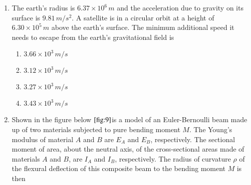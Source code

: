 \documentclass[journal]{IEEEtran}
\numberwithin{equation}{enumi}
\numberwithin{figure}{enumi}
\begin{document}
\begin{enumerate}
\begin{multicols}{2}
    \begin{enumerate}
        \item $ x = 10 \sin 24.76t $
        \item $ x = 10 \cos 24.76t $
        \item $ x = \sin 16t $
        \item $ x = 10 \cos 16t $
    \end{enumerate}
\end{multicols}
\bigskip
\item The earth's radius is $6.37 \times 10^6 \, m$ and the acceleration due to gravity on its surface is $9.81 \, m/s^2$. A satellite is in a circular orbit at a height of $6.30 \times 10^5 \, m$ above the earth's surface. The minimum additional speed it needs to escape from the earth's gravitational field is
\begin{multicols}{2}
    \begin{enumerate}
        \item $ 3.66 \times 10^3 \, m/s $
        \item $ 3.12 \times 10^3 \, m/s $
        \item $ 3.27 \times 10^3 \, m/s $
        \item $ 3.43 \times 10^3 \, m/s $
    \end{enumerate}
\end{multicols}
\bigskip
\item Shown in the figure below $\ref{fig:9}$is a model of an Euler-Bernoulli beam made up of two materials subjected to pure bending moment $M$. The Young's modulus of material $A$ and $B$ are $E_A$ and $E_B$, respectively. The sectional moment of area, about the neutral axis, of the cross-sectional areas made of materials $A$ and $B$, are $I_A$ and $I_B$, respectively. The radius of curvature $\rho$ of the flexural deflection of this composite beam to the bending moment $M$ is then\\\\
\usetikzlibrary{patterns}
\begin{figure}[h] %
    \centering
\end{figure}
\end{enumerate}
\end{document}
